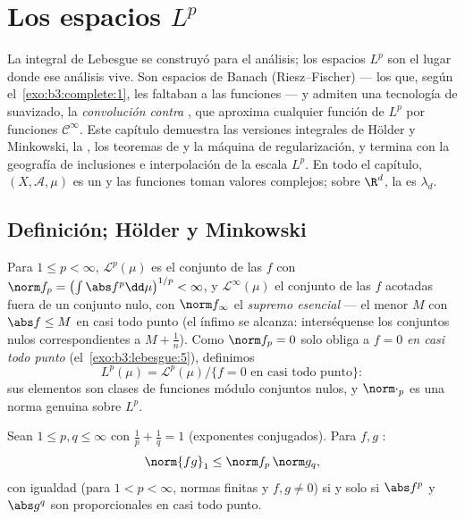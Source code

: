 \chapter{Los espacios \texorpdfstring{$L^p$}{Lp}}\label{ch:b3:lp}

La integral de Lebesgue se construyó para el análisis; los espacios
$L^p$ son el lugar donde ese análisis vive. Son espacios de Banach
(Riesz--Fischer) --- los
 que, según
el~\cref{exo:b3:complete:1}, les faltaban a las funciones
 --- y admiten una
tecnología de suavizado, la \emph{convolución contra
}, que aproxima
cualquier función de $L^p$ por funciones $\mathcal C^\infty$. Este
capítulo demuestra las versiones integrales de Hölder y Minkowski, la
, los teoremas de
 y la máquina de regularización,
y termina con la geografía de inclusiones e interpolación de la escala
$L^p$. En todo el capítulo, $(X, \mathcal A, \mu)$ es un
 y las funciones toman
valores complejos; sobre $\R^d$, la
 es
$\lambda_d$.

\section{Definición; Hölder y Minkowski}

\begin{definition}\label{def:b3:lp:space}
Para $1 \leq p < \infty$, $\mathcal L^p(\mu)$ es el conjunto de las $f$
 con
$\norm f_p = \bigl(\int\abs
f^p\dd\mu\bigr)^{1/p} < \infty$, y $\mathcal L^\infty(\mu)$ el conjunto
de las $f$ acotadas fuera de un conjunto nulo, con $\norm
f_\infty$ el \emph{supremo esencial} --- el menor $M$ con
$\abs f \leq M$ en casi todo punto (el ínfimo se alcanza: interséquense
los conjuntos nulos correspondientes a $M + \frac1n$). Como
$\norm f_p = 0$ solo obliga a $f
= 0$ \emph{en casi todo punto} (el~\cref{exo:b3:lebesgue:5}), definimos
\[
L^p(\mu) = \mathcal L^p(\mu)/\{f = 0 \text{ en casi todo punto}\} :
\]
sus elementos son clases de funciones módulo conjuntos nulos, y
$\norm\cdot_p$ es una norma genuina sobre $L^p$.
\end{definition}

\begin{theorem}\label{thm:b3:lp:holder}
Sean $1 \leq p, q \leq \infty$ con $\frac1p + \frac1q = 1$ (exponentes
conjugados). Para $f, g$
:
\[
\norm{fg}_1 \leq \norm f_p\,\norm g_q ,
\]
con igualdad (para $1 < p < \infty$, normas finitas y $f,g\ne0$) si y
solo si $\abs f^p$ y $\abs g^q$ son proporcionales en casi todo punto.
\end{theorem}


